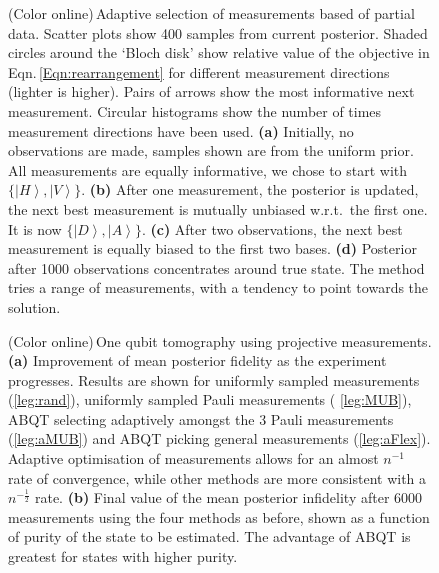 \begin{figure}

\caption{(Color online)\,Adaptive selection of measurements based of partial data. Scatter plots show 400 samples from current posterior. Shaded circles around the `Bloch disk' show relative value of the objective in Eqn.\,\eqref{Eqn:rearrangement} for different measurement directions (lighter is higher). Pairs of arrows show the most informative next measurement. Circular histograms show the number of times measurement directions have been used. \textbf{(a)}  Initially, no observations are made, samples shown are from the uniform prior. All measurements are equally informative, we chose to start with $\{\left\vert H\right\rangle,\left\vert V\right\rangle\}$. \textbf{(b)}  After one measurement, the posterior is updated, the next best measurement is mutually unbiased w.r.t.\ the first one. It is now $\{\left\vert D\right\rangle,\left\vert A\right\rangle\}$. \textbf{(c)} After two observations, the next best measurement is equally biased to the first two bases. \textbf{(d)} Posterior after 1000 observations concentrates around true state. The method tries a range of measurements, with a tendency to point towards the solution.
\label{fig:Bloch disk}}
\end{figure}

\begin{figure}
\figtwo
\caption{(Color online)\,One qubit tomography using projective measurements. \textbf{(a)}  Improvement of mean posterior fidelity as the experiment progresses. Results are shown for uniformly sampled measurements (\ref{leg:rand}), uniformly sampled Pauli measurements ( \ref{leg:MUB}), ABQT selecting adaptively amongst the 3 Pauli measurements (\ref{leg:aMUB}) and ABQT picking general measurements (\ref{leg:aFlex}). Adaptive optimisation of measurements allows for an almost $n^{-1}$ rate of convergence, while other methods are more consistent with a $n^{-\frac{1}{2}}$ rate. \textbf{(b)}  Final value of the mean posterior infidelity after 6000 measurements using the four methods as before, shown as a function of purity of the state to be estimated. The advantage of ABQT is greatest for states with higher purity. \label{fig:qubit_results}}
\end{figure}

